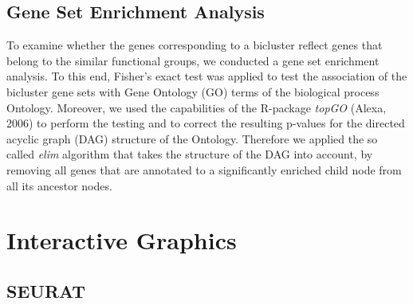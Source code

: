 \subsection{Gene Set Enrichment Analysis}
To examine whether the genes corresponding to a bicluster reflect genes that belong to the similar functional groups, we conducted a gene set enrichment analysis.
To this end, Fisher's exact test was applied to test the association of the bicluster gene sets with Gene Ontology (GO) terms of the biological process Ontology.
Moreover, we used the capabilities of the R-package \textit{topGO} (Alexa, 2006) to perform the testing and to correct the resulting p-values for the directed acyclic graph (DAG) structure of the Ontology. Therefore we applied the so called \textit{elim} algorithm that takes the structure of the DAG into account, by removing all genes that are annotated to a significantly enriched child node from all its ancestor nodes. 

\section{Interactive Graphics}
\subsection{SEURAT}


